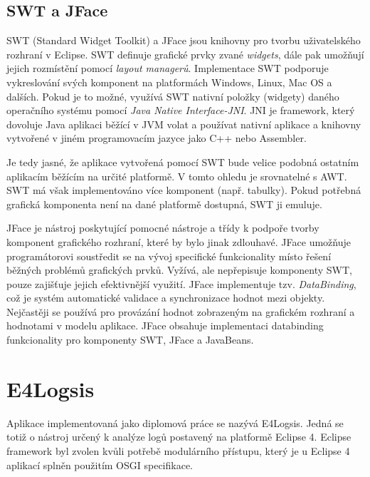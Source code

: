\documentclass[ing,male,java,dept460]{diploma}		%
\begin{document}
\subsection{SWT a JFace}
SWT (Standard Widget Toolkit) a JFace jsou knihovny pro tvorbu uživatelského rozhraní v Eclipse. SWT definuje grafické prvky zvané \textit{widgets}, dále pak umožňují jejich rozmístění pomocí \textit{layout managerů}. Implementace SWT podporuje vykreslování svých komponent na platformách Windows, Linux, Mac OS a dalších. Pokud je to možné, využívá SWT nativní položky (widgety) daného operačního systému pomocí \textit{Java Native Interface-JNI}. JNI je framework, který dovoluje Java aplikaci běžící v JVM volat a používat nativní aplikace a knihovny vytvořené v jiném programovacím jazyce jako C++ nebo Assembler.
\par Je tedy jasné, že aplikace vytvořená pomocí SWT bude velice podobná ostatním aplikacím běžícím na určité platformě. V tomto ohledu je srovnatelné s AWT. SWT má však implementováno více komponent (např. tabulky). Pokud potřebná grafická komponenta není na dané platformě dostupná, SWT ji emuluje\cite{vogellaSWT}.
\par JFace je nástroj poskytující pomocné nástroje a třídy k podpoře tvorby komponent grafického rozhraní, které by bylo jinak zdlouhavé. JFace umožňuje programátorovi soustředit se na vývoj specifické funkcionality místo řešení běžných problémů grafických prvků. Vyžívá, ale nepřepisuje komponenty SWT, pouze zajišťuje jejich efektivnější využití\cite{eclipseJFace}. JFace implementuje tzv. \textit{DataBinding}, což je systém automatické validace a synchronizace hodnot mezi objekty. Nejčastěji se používá pro provázání hodnot zobrazeným na grafickém rozhraní a hodnotami v modelu aplikace. JFace obsahuje implementaci databinding funkcionality pro komponenty SWT, JFace a JavaBeans\cite{eclipseJFaceDatabinding}.



\section{E4Logsis}
Aplikace implementovaná jako diplomová práce se nazývá E4Logsis. Jedná se totiž o nástroj určený k analýze logů postavený na platformě Eclipse 4. Eclipse framework byl zvolen kvůli potřebě modulárního přístupu, který je u Eclipse 4 aplikací splněn použitím OSGI specifikace.
\end{document}
